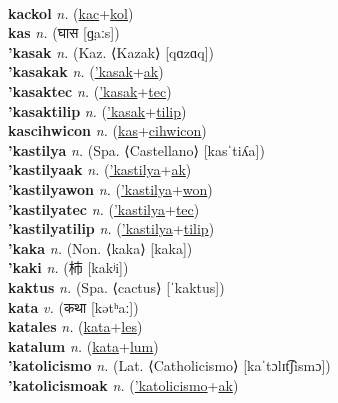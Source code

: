  \label{kackas} \\
\textbf{kackol} \textit{n.} (\hyperref[kac]{kac}+\hyperref[kol]{kol})
 \label{kackol} \\
\textbf{kas} \textit{n.} ({\devanagari{}घास} [ɡ̤aːs])
 \label{kas} \\
\textbf{'kasak} \textit{n.} (Kaz. ⟨Kazak⟩ [qɑzɑq])
 \label{'kasak} \\
\textbf{'kasakak} \textit{n.} (\hyperref['kasak]{'kasak}+\hyperref[ak]{ak})
 \label{'kasakak} \\
\textbf{'kasaktec} \textit{n.} (\hyperref['kasak]{'kasak}+\hyperref[tec]{tec})
 \label{'kasaktec} \\
\textbf{'kasaktilip} \textit{n.} (\hyperref['kasak]{'kasak}+\hyperref[tilip]{tilip})
 \label{'kasaktilip} \\
\textbf{kascihwicon} \textit{n.} (\hyperref[kas]{kas}+\hyperref[cihwicon]{cihwicon})
 \label{kascihwicon} \\
\textbf{'kastilya} \textit{n.} (Spa. ⟨Castellano⟩ [kasˈtiʎa])
 \label{'kastilya} \\
\textbf{'kastilyaak} \textit{n.} (\hyperref['kastilya]{'kastilya}+\hyperref[ak]{ak})
 \label{'kastilyaak} \\
\textbf{'kastilyawon} \textit{n.} (\hyperref['kastilya]{'kastilya}+\hyperref[won]{won})
 \label{'kastilyawon} \\
\textbf{'kastilyatec} \textit{n.} (\hyperref['kastilya]{'kastilya}+\hyperref[tec]{tec})
 \label{'kastilyatec} \\
\textbf{'kastilyatilip} \textit{n.} (\hyperref['kastilya]{'kastilya}+\hyperref[tilip]{tilip})
 \label{'kastilyatilip} \\
\textbf{'kaka} \textit{n.} (Non. ⟨kaka⟩ [kaka])
 \label{'kaka} \\
\textbf{'kaki} \textit{n.} ({\japanese{}柿} [kakʲi])
 \label{'kaki} \\
\textbf{kaktus} \textit{n.} (Spa. ⟨cactus⟩ [ˈkaktus])
 \label{kaktus} \\
\textbf{kata} \textit{v.} ({\devanagari{}कथा} [kətʰaː])
 \label{kata} \\
\textbf{katales} \textit{n.} (\hyperref[kata]{kata}+\hyperref[les]{les})
 \label{katales} \\
\textbf{katalum} \textit{n.} (\hyperref[kata]{kata}+\hyperref[lum]{lum})
 \label{katalum} \\
\textbf{'katolicismo} \textit{n.} (Lat. ⟨Catholicismo⟩ [kaˈtɔlɪt͡ʃismɔ])
 \label{'katolicismo} \\
\textbf{'katolicismoak} \textit{n.} (\hyperref['katolicismo]{'katolicismo}+\hyperref[ak]{ak})
